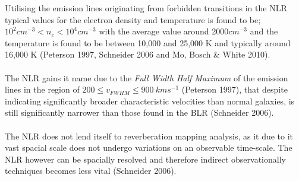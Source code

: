 \documentclass[a4paper, 12pt, twoside]{article}
\begin{document}
Utilising the emission lines originating from forbidden transitions in the NLR typical values for the electron density and temperature is found to be; $10^{2} cm^{-3} < n_{e} < 10^{4} cm^{-3}$ with the average value around 2000$cm^{-3}$ and the temperature is found to be between 10,000 and 25,000 K and typically around 16,000 K (Peterson 1997, Schneider 2006 and Mo, Bosch \& White 2010). \\
\\
The NLR gains it name due to the \emph{Full Width Half Maximum} of the emission lines in the region of $200 \le v_{FWHM} \le 900\ kms^{-1}$ (Peterson 1997), that despite indicating significantly broader characteristic velocities than normal galaxies, is still significantly narrower than those found in the BLR (Schneider 2006). \\
\\
The NLR does not lend itself to reverberation mapping analysis, as it due to it vast spacial scale does not undergo variations on an observable time-scale. The NLR however can be spacially resolved and therefore indirect observationally techniques becomes less vital (Schneider 2006). 
\end{document}
